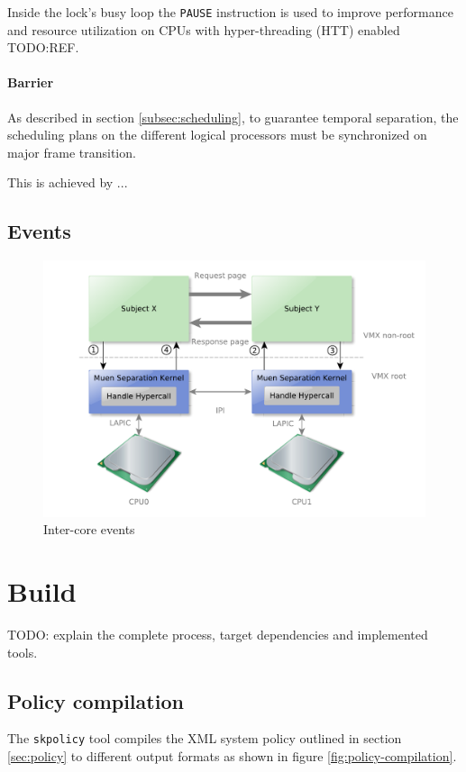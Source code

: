 Inside the lock's busy loop the \texttt{PAUSE} instruction is used to improve
performance and resource utilization on CPUs with hyper-threading
(HTT) enabled TODO:REF.

\paragraph{Barrier}
As described in section \ref{subsec:scheduling}, to guarantee temporal
separation, the scheduling plans on the different logical processors must be
synchronized on major frame transition.

This is achieved by ...

\subsection{Events}
\begin{figure}[h]
	\centering
	\includegraphics[width=\textwidth]{images/inter-core-events}
	\caption{Inter-core events}
	\label{fig:inter-core-events}
\end{figure}

\section{Build}
TODO: explain the complete process, target dependencies and implemented tools.

\subsection{Policy compilation}
The \texttt{skpolicy} tool compiles the XML system policy outlined in section
\ref{sec:policy} to different output formats as shown in figure
\ref{fig:policy-compilation}.

